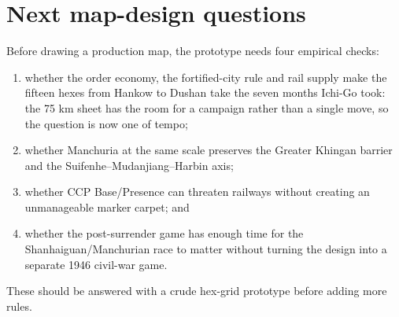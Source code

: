 \documentclass[11pt]{article}
\begin{document}
\section{Next map-design questions}
Before drawing a production map, the prototype needs four empirical checks:
\begin{enumerate}
\item whether the order economy, the fortified-city rule and rail supply make the fifteen hexes from Hankow to Dushan take the seven months Ichi-Go took: the 75 km sheet has the room for a campaign rather than a single move, so the question is now one of tempo;
\item whether Manchuria at the same scale preserves the Greater Khingan barrier and the Suifenhe--Mudanjiang--Harbin axis;
\item whether CCP Base/Presence can threaten railways without creating an unmanageable marker carpet; and
\item whether the post-surrender game has enough time for the Shanhaiguan/Manchurian race to matter without turning the design into a separate 1946 civil-war game.
\end{enumerate}

These should be answered with a crude hex-grid prototype before adding more rules.
\end{document}
